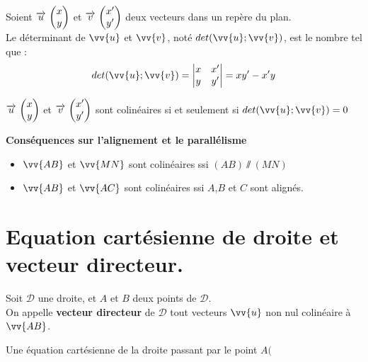 \documentclass[12pt,a4paper]{article}
\begin{document}
\begin{defi}
Soient $\overrightarrow{u}\, \begin{pmatrix} x\\ y \end{pmatrix}$ et $\overrightarrow{v}\, \begin{pmatrix} x'\\ y' \end{pmatrix}$ deux vecteurs dans un repère du plan.\\
Le déterminant de $\vv{u}$ et $\vv{v}$, noté $det(\vv{u};\vv{v})$, est le nombre tel que : $$det(\vv{u};\vv{v})=\begin{vmatrix} x & x' \\ y & y' \end{vmatrix}=xy'-x'y$$

\end{defi}


\begin{pro}
$\overrightarrow{u}\, \begin{pmatrix} x\\ y \end{pmatrix}$ et $\overrightarrow{v}\, \begin{pmatrix} x'\\ y' \end{pmatrix}$ sont colinéaires si et seulement si $det(\vv{u};\vv{v})=0$
\end{pro}

\begin{pro}
\textbf{Conséquences sur l'alignement et le parallélisme}

\begin{itemize}
    \item $\vv{AB}$ et $\vv{MN}$ sont colinéaires ssi $(AB)\sslash (MN)$
    \item $\vv{AB}$ et $\vv{AC}$ sont colinéaires ssi $A$,$B$ et $C$ sont alignés.
\end{itemize}
\end{pro}



\section{Equation cartésienne de droite et vecteur directeur.}

\begin{defi}
Soit $\mathscr{D}$ une droite, et $A$ et $B$ deux points de $\mathscr{D}$.\\
On appelle \textbf{vecteur directeur} de $\mathscr{D}$ tout vecteurs $\vv{u}$ non nul colinéaire à $\vv{AB}$.
\end{defi}

\begin{pro}
Une équation cartésienne de la droite passant par le point $A($
\end{pro}
\end{document}
